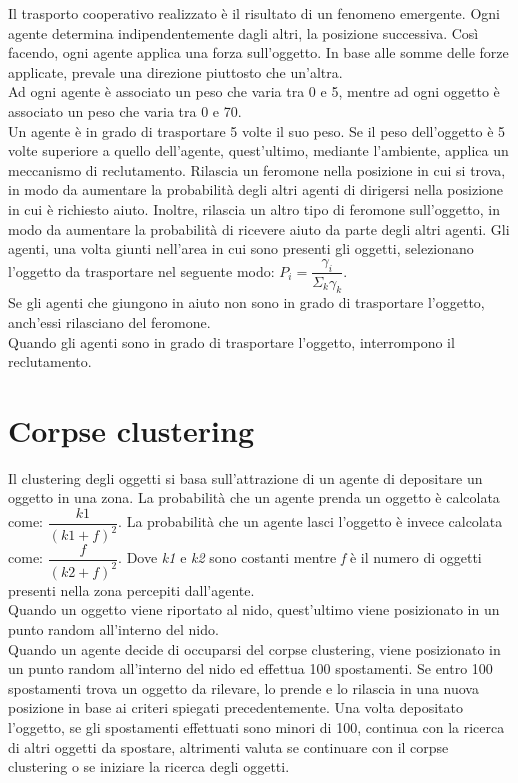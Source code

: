 \documentclass[12pt,a4paper,openright,twoside]{report}
\begin{document}
Il trasporto cooperativo realizzato è il risultato di un fenomeno emergente. Ogni agente determina indipendentemente dagli altri, la posizione successiva. Così facendo, ogni agente applica una forza sull'oggetto. In base alle somme delle forze applicate, prevale una direzione piuttosto che un'altra.\\
Ad ogni agente è associato un peso che varia tra 0 e 5, mentre ad ogni oggetto è associato un peso che varia tra 0 e 70.\\ Un agente è in grado di trasportare 5 volte il suo peso. Se il peso dell'oggetto è 5 volte superiore a quello dell'agente, quest'ultimo, mediante l'ambiente, applica un meccanismo di reclutamento. Rilascia un feromone nella posizione in cui si trova, in modo da aumentare la probabilità degli altri agenti di dirigersi nella posizione in cui è richiesto aiuto. Inoltre, rilascia un altro tipo di feromone sull'oggetto, in modo da aumentare la probabilità di ricevere aiuto da parte degli altri agenti. Gli agenti, una volta giunti nell'area in cui sono presenti gli oggetti, selezionano l'oggetto da trasportare nel seguente modo: $P_i =\dfrac{\gamma_i}{\Sigma_k \gamma_k}$.\\ Se gli agenti che giungono in aiuto non sono in grado di trasportare l'oggetto, anch'essi rilasciano del feromone.\\
Quando gli agenti sono in grado di trasportare l'oggetto, interrompono il reclutamento.

\section{Corpse clustering}

Il clustering degli oggetti si basa sull'attrazione di un agente di depositare un oggetto in una zona. La probabilità che un agente prenda un oggetto è calcolata come: $\dfrac{k1}{(k1+f)^2}$. La probabilità che un agente lasci l'oggetto è invece calcolata come: $\dfrac{f}{(k2+f)^2}$. Dove \textit{k1} e \textit{k2} sono costanti mentre \textit{f} è il numero di oggetti presenti nella zona percepiti dall'agente.\\
Quando un oggetto viene riportato al nido, quest'ultimo viene posizionato in un punto random all'interno del nido.\\
Quando un agente decide di occuparsi del corpse clustering, viene posizionato in un punto random all'interno del nido ed effettua 100 spostamenti. Se entro 100 spostamenti trova un oggetto da rilevare, lo prende e lo rilascia in una nuova posizione in base ai criteri spiegati precedentemente. Una volta depositato l'oggetto, se gli spostamenti effettuati sono minori di 100, continua con la ricerca di altri oggetti da spostare, altrimenti valuta se continuare con il corpse clustering o se iniziare la ricerca degli oggetti.
\end{document}
